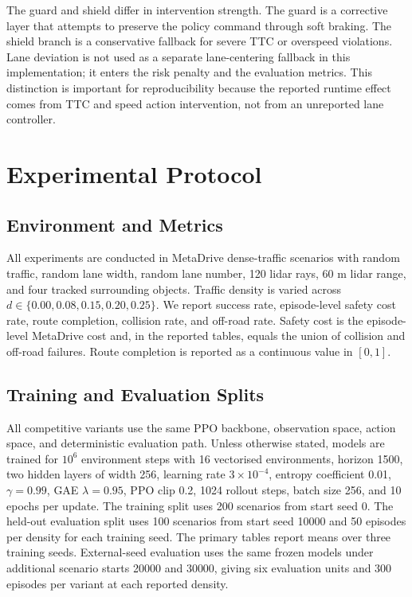 \documentclass[conference,a4paper]{IEEEtran}
\begin{document}
The guard and shield differ in intervention strength. The guard is a corrective layer that attempts to preserve the policy command through soft braking. The shield branch is a conservative fallback for severe TTC or overspeed violations. Lane deviation is not used as a separate lane-centering fallback in this implementation; it enters the risk penalty and the evaluation metrics. This distinction is important for reproducibility because the reported runtime effect comes from TTC and speed action intervention, not from an unreported lane controller.

\section{Experimental Protocol}
\subsection{Environment and Metrics}
All experiments are conducted in MetaDrive dense-traffic scenarios with random traffic, random lane width, random lane number, 120 lidar rays, 60 m lidar range, and four tracked surrounding objects. Traffic density is varied across $d\in\{0.00,0.08,0.15,0.20,0.25\}$. We report success rate, episode-level safety cost rate, route completion, collision rate, and off-road rate. Safety cost is the episode-level MetaDrive cost and, in the reported tables, equals the union of collision and off-road failures. Route completion is reported as a continuous value in $[0,1]$.

\subsection{Training and Evaluation Splits}
All competitive variants use the same PPO backbone, observation space, action space, and deterministic evaluation path. Unless otherwise stated, models are trained for $10^6$ environment steps with 16 vectorised environments, horizon 1500, two hidden layers of width 256, learning rate $3\times10^{-4}$, entropy coefficient 0.01, $\gamma=0.99$, GAE $\lambda=0.95$, PPO clip 0.2, 1024 rollout steps, batch size 256, and 10 epochs per update. The training split uses 200 scenarios from start seed 0. The held-out evaluation split uses 100 scenarios from start seed 10000 and 50 episodes per density for each training seed. The primary tables report means over three training seeds. External-seed evaluation uses the same frozen models under additional scenario starts 20000 and 30000, giving six evaluation units and 300 episodes per variant at each reported density.
\end{document}
